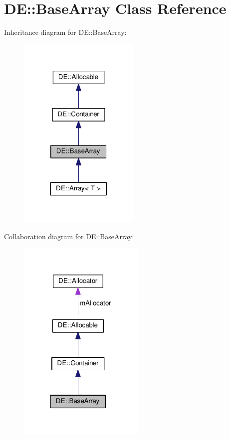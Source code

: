 \hypertarget{classDE_1_1BaseArray}{}\section{DE\+:\+:Base\+Array Class Reference}
\label{classDE_1_1BaseArray}


Inheritance diagram for DE\+:\+:Base\+Array\+:\nopagebreak
\begin{figure}[H]
\begin{center}
\leavevmode
\includegraphics[width=164pt]{classDE_1_1BaseArray__inherit__graph}
\end{center}
\end{figure}


Collaboration diagram for DE\+:\+:Base\+Array\+:\nopagebreak
\begin{figure}[H]
\begin{center}
\leavevmode
\includegraphics[width=172pt]{classDE_1_1BaseArray__coll__graph}
\end{center}
\end{figure}
